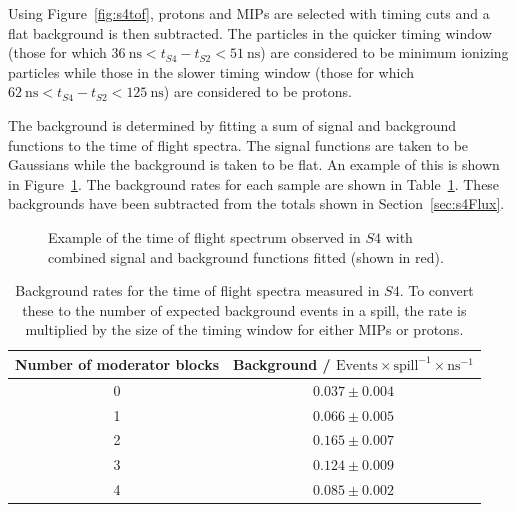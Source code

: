 Using Figure~\ref{fig:s4tof}, protons and MIPs are selected with timing cuts and a flat background is then subtracted.
The particles in the quicker timing window (those for which $36~\text{ns}<t_{\mathit{S4}}-t_{\mathit{S2}}<51~\text{ns}$) are considered to be minimum ionizing particles while those in the slower timing window (those for which $62~\text{ns}<t_{\mathit{S4}}-t_{\mathit{S2}}<125~\text{ns}$) are considered to be protons.

The background is determined by fitting a sum of signal and background functions to the time of flight spectra.
The signal functions are taken to be Gaussians while the background is taken to be flat. 
An example of this is shown in Figure~\ref{fig:fitEx}.
The background rates for each sample are shown in Table~\ref{tab:backgrounds}.
These backgrounds have been subtracted from the totals shown in Section~\ref{sec:s4Flux}.

\begin{figure}[h]
  \begin{adjustbox}{max totalsize={.8\textwidth}{.62\textheight},center}
    
  \end{adjustbox}
  \caption{Example of the time of flight spectrum observed in $\mathit{S4}$ with combined signal and background functions fitted (shown in red).}
  \label{fig:fitEx}
\end{figure}

\begin{table}
  \centering
  \caption{Background rates for the time of flight spectra measured in $\mathit{S4}$. To convert these to the number of expected background events in a spill, the rate is multiplied by the size of the timing window for either MIPs or protons.}
  \begin{tabular}{c|c}
    \hline
    \hline
    Number of moderator blocks & Background / $\text{Events} \times \text{spill}^{-1} \times \text{ns}^{-1}$ \\
    \hline
    0 & $0.037 \pm 0.004$ \\
    1 & $0.066 \pm 0.005$ \\
    2 & $0.165 \pm 0.007$ \\
    3 & $0.124 \pm 0.009$ \\
    4 & $0.085 \pm 0.002$ \\
    \hline
  \end{tabular}
  \label{tab:backgrounds}
\end{table}


